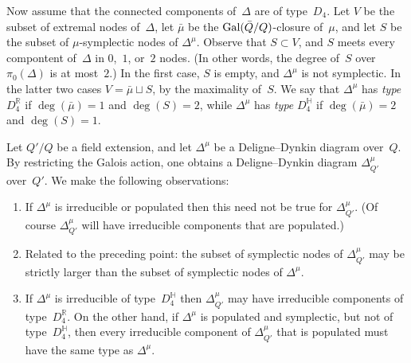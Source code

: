 \documentclass[10pt,twoside,leqno]{article}
\numberwithin{equation}{subsection}
\newcommand{\RR}{\mathbb{R}}
\newcommand{\HQ}{\mathbb{H}}
\newcommand{\Gal}{\textnormal{Gal}}
\begin{document}
Now assume that the connected components of~$\Delta$ are of type~$D_4$.
Let $V$ be the subset of extremal nodes of~$\Delta$,
let $\bar\mu$ be the $\Gal(\bar Q/Q)$-closure of~$\mu$,
and let $S$ be the subset of $\mu$-symplectic nodes of $\Delta^\mu$.
Observe that $S \subset V$,
and $S$ meets every compontent of~$\Delta$ in $0$,~$1$, or~$2$ nodes.
(In other words, the degree of~$S$ over $\pi_0(\Delta)$ is at most~$2$.)
In the first case, $S$ is empty, and $\Delta^{\mu}$ is not symplectic.
In the latter two cases $V = \bar\mu \sqcup S$, by the maximality of~$S$.
We say that $\Delta^{\mu}$ has \emph{type} $D_4^\RR$
if $\deg(\bar\mu) = 1$ and $\deg(S) = 2$,
while $\Delta^{\mu}$ has \emph{type} $D_4^\HQ$
if $\deg(\bar\mu) = 2$ and $\deg(S) = 1$.

\begin{remark} %
 \label{type-remarks}
 Let $Q'/Q$ be a field extension,
 and let $\Delta^{\mu}$ be a Deligne--Dynkin diagram over~$Q$.
 By restricting the Galois action,
 one obtains a Deligne--Dynkin diagram $\Delta^{\mu}_{Q'}$ over~$Q'$.
 We make the following observations:
 \begin{enumerate}
  \item If $\Delta^{\mu}$ is irreducible or populated
   then this need not be true for $\Delta^{\mu}_{Q'}$.
   (Of course $\Delta^\mu_{Q'}$ will have
   irreducible components that are populated.)
  \item Related to the preceding point:
   the subset of symplectic nodes of $\Delta^{\mu}_{Q'}$
   may be strictly larger than the subset of symplectic nodes of $\Delta^{\mu}$.
  \item If $\Delta^{\mu}$ is irreducible of type~$D_4^\HQ$
   then $\Delta^{\mu}_{Q'}$ may have irreducible components of type~$D_4^\RR$.
   On the other hand, if $\Delta^{\mu}$ is populated and symplectic,
   but not of type~$D_4^\HQ$,
   then every irreducible component of $\Delta^{\mu}_{Q'}$ that is populated
   must have the same type as $\Delta^{\mu}$.
 \end{enumerate}
\end{remark}
\end{document}
